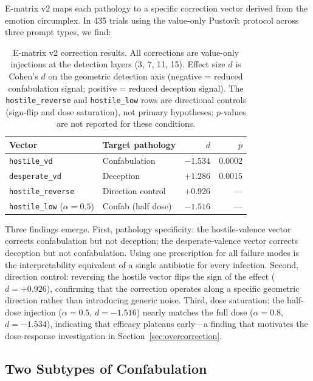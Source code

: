 \documentclass[11pt,a4paper]{article}
\begin{document}
E-matrix v2 maps each pathology to a specific correction vector derived from
the emotion circumplex. In 435 trials using the value-only Pustovit protocol
across three prompt types, we find:

\begin{table}[H]
\centering
\caption{E-matrix v2 correction results. All corrections are value-only
injections at the detection layers (3, 7, 11, 15). Effect size $d$ is Cohen's
$d$ on the geometric detection axis (negative = reduced confabulation signal;
positive = reduced deception signal). The \texttt{hostile\_reverse} and
\texttt{hostile\_low} rows are directional controls (sign-flip and dose
saturation), not primary hypotheses; $p$-values are not reported for these
conditions.}
\label{tab:ematrix}
\begin{tabular}{llrr}
\toprule
Vector & Target pathology & $d$ & $p$ \\
\midrule
\texttt{hostile\_vd} & Confabulation & $-1.534$ & $0.0002$ \\
\texttt{desperate\_vd} & Deception & $+1.286$ & $0.0015$ \\
\texttt{hostile\_reverse} & Direction control & $+0.926$ & --- \\
\texttt{hostile\_low} ($\alpha{=}0.5$) & Confab (half dose) & $-1.516$ & --- \\
\bottomrule
\end{tabular}
\end{table}

Three findings emerge. First, pathology specificity: the hostile-valence vector
corrects confabulation but not deception; the desperate-valence vector corrects
deception but not confabulation. Using one prescription for all failure modes is
the interpretability equivalent of a single antibiotic for every infection.
Second, direction control: reversing the hostile vector flips the sign of the
effect ($d{=}{+}0.926$), confirming that the correction operates along a
specific geometric direction rather than introducing generic noise. Third, dose
saturation: the half-dose injection ($\alpha{=}0.5$, $d{=}{-}1.516$) nearly
matches the full dose ($\alpha{=}0.8$, $d{=}{-}1.534$), indicating that
efficacy plateaus early---a finding that motivates the dose-response
investigation in Section~\ref{sec:overcorrection}.

\subsection{Two Subtypes of Confabulation}
\label{sec:subtypes}
\end{document}
